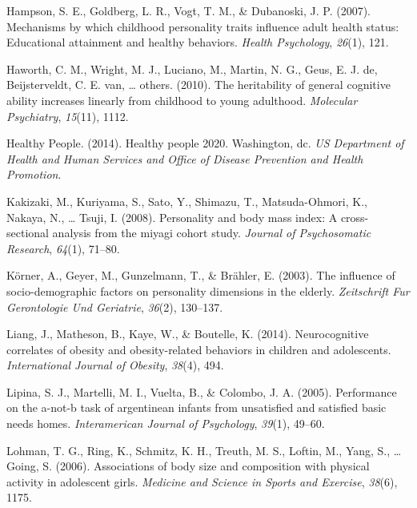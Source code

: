 \documentclass[man]{apa6}
\begin{document}
\leavevmode\hypertarget{ref-hampson2007mechanisms}{}%
Hampson, S. E., Goldberg, L. R., Vogt, T. M., \& Dubanoski, J. P. (2007). Mechanisms by which childhood personality traits influence adult health status: Educational attainment and healthy behaviors. \emph{Health Psychology}, \emph{26}(1), 121.

\leavevmode\hypertarget{ref-haworth2010heritability}{}%
Haworth, C. M., Wright, M. J., Luciano, M., Martin, N. G., Geus, E. J. de, Beijsterveldt, C. E. van, \ldots{} others. (2010). The heritability of general cognitive ability increases linearly from childhood to young adulthood. \emph{Molecular Psychiatry}, \emph{15}(11), 1112.

\leavevmode\hypertarget{ref-us2014healthy}{}%
Healthy People. (2014). Healthy people 2020. Washington, dc. \emph{US Department of Health and Human Services and Office of Disease Prevention and Health Promotion}.

\leavevmode\hypertarget{ref-kakizaki2008personality}{}%
Kakizaki, M., Kuriyama, S., Sato, Y., Shimazu, T., Matsuda-Ohmori, K., Nakaya, N., \ldots{} Tsuji, I. (2008). Personality and body mass index: A cross-sectional analysis from the miyagi cohort study. \emph{Journal of Psychosomatic Research}, \emph{64}(1), 71--80.

\leavevmode\hypertarget{ref-korner2003influence}{}%
Körner, A., Geyer, M., Gunzelmann, T., \& Brähler, E. (2003). The influence of socio-demographic factors on personality dimensions in the elderly. \emph{Zeitschrift Fur Gerontologie Und Geriatrie}, \emph{36}(2), 130--137.

\leavevmode\hypertarget{ref-liang2014neurocognitive}{}%
Liang, J., Matheson, B., Kaye, W., \& Boutelle, K. (2014). Neurocognitive correlates of obesity and obesity-related behaviors in children and adolescents. \emph{International Journal of Obesity}, \emph{38}(4), 494.

\leavevmode\hypertarget{ref-lipina2005performance}{}%
Lipina, S. J., Martelli, M. I., Vuelta, B., \& Colombo, J. A. (2005). Performance on the a-not-b task of argentinean infants from unsatisfied and satisfied basic needs homes. \emph{Interamerican Journal of Psychology}, \emph{39}(1), 49--60.

\leavevmode\hypertarget{ref-lohman2006associations}{}%
Lohman, T. G., Ring, K., Schmitz, K. H., Treuth, M. S., Loftin, M., Yang, S., \ldots{} Going, S. (2006). Associations of body size and composition with physical activity in adolescent girls. \emph{Medicine and Science in Sports and Exercise}, \emph{38}(6), 1175.
\end{document}
